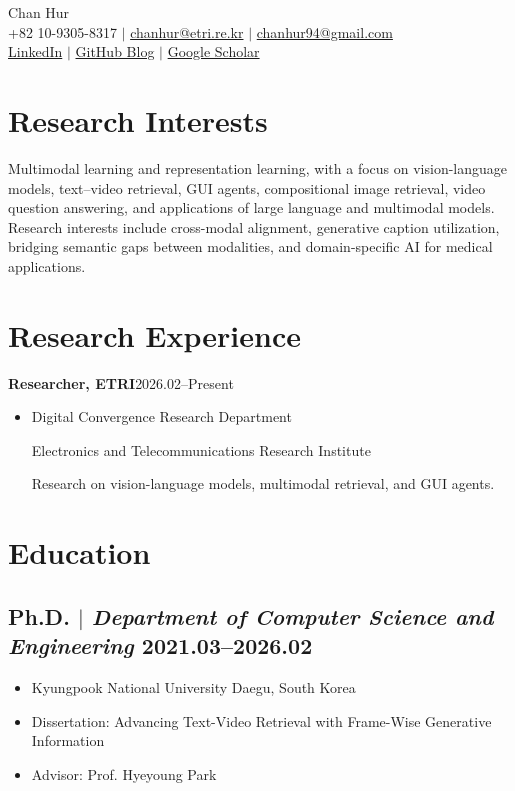 \documentclass[10pt,a4paper]{article}
\newif\ifRemVS
\newcommand{\rvs}{\ifRemVS\vspace{-1.5ex}\fi\global\RemVSfalse}
\newcommand{\cventry}[3]{%
  \noindent\begin{minipage}{\linewidth}
    \rvs
    {\small\textbf{#1}\hfill #2\par}
    \begin{itemize}[topsep=2pt]\item #3\end{itemize}
  \end{minipage}\par}
\begin{document}
\begin{center}
  {\fontsize{36}{36}\selectfont\interheavy Chan Hur}\\\bigskip
  {\color{icnclr}} +82 10-9305-8317 $|$
  {\color{icnclr}\faEnvelope[regular]} \href{mailto:chanhur@etri.re.kr}{chanhur@etri.re.kr} $|$
  \href{mailto:chanhur94@gmail.com}{chanhur94@gmail.com}\\
  \href{https://www.linkedin.com/in/chan-hur/}{{\color{icnclr}\faLinkedinIn} LinkedIn} $|$
  \href{https://chan-kor.github.io/}{{\color{icnclr}\faGithub} GitHub Blog} $|$
  \href{https://scholar.google.co.kr/citations?user=aOc_KKEAAAAJ}{Google Scholar}
\end{center}

\section{Res\color{black}earch Interests}
\footnotesize
Multimodal learning and representation learning, with a focus on vision-language models,
text–video retrieval, GUI agents, compositional image retrieval, video question answering,
and applications of large language and multimodal models. Research interests include
cross-modal alignment, generative caption utilization, bridging semantic gaps between
modalities, and domain-specific AI for medical applications.

\section{Res\color{black}earch Experience}
\cventry{Researcher, ETRI}{2026.02–Present}{%
  Digital Convergence Research Department\par
  Electronics and Telecommunications Research Institute\par
  Research on vision-language models, multimodal retrieval, and GUI agents.}

\section{Edu\color{black}cation}
\subsection{Ph.D. $|$ {\normalfont\textit{Department of Computer Science and Engineering}} \hfill 2021.03–2026.02}
\begin{itemize}
  \item Kyungpook National University \hfill Daegu, South Korea
  \item Dissertation: Advancing Text-Video Retrieval with Frame-Wise Generative Information
  \item Advisor: Prof. Hyeyoung Park
\end{itemize}
\end{document}
